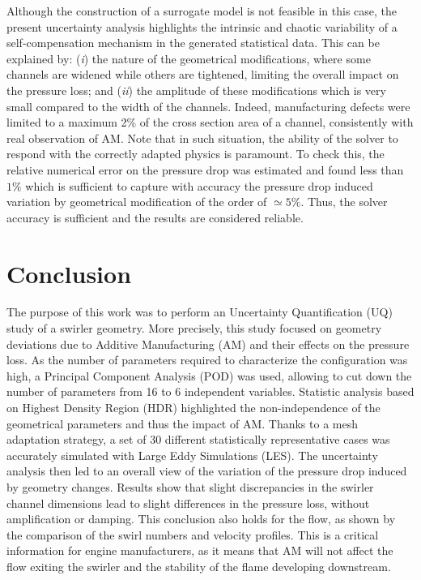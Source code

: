 Although the construction of a surrogate model is not feasible in this case, the present uncertainty analysis highlights the intrinsic and chaotic variability of a self-compensation mechanism in the generated statistical data. This can be explained by: (\emph{i}) the nature of the geometrical modifications, where some channels are widened while others are tightened, limiting the overall impact on the pressure loss; and (\emph{ii}) the amplitude of these modifications which is very small compared to the width of the channels. Indeed, manufacturing defects were limited to a maximum 2\% of the cross section area of a channel, consistently with real observation of AM. Note that in such situation, the ability of the solver to respond with the correctly adapted physics is paramount. To check this, the relative numerical error on the pressure drop was estimated and found less than $1\%$ which is sufficient to capture with accuracy the pressure drop induced variation by geometrical modification of the order of $\simeq 5\%$. Thus, the solver accuracy is sufficient and the results are considered reliable.

\section{Conclusion}
The purpose of this work was to perform an Uncertainty Quantification (UQ) study of a swirler geometry. More precisely, this study focused on geometry deviations due to Additive Manufacturing (AM) and their effects on the pressure loss. As the number of parameters required to characterize the configuration was high, a Principal Component Analysis (POD) was used, allowing to cut down the number of parameters from 16 to 6 independent variables. Statistic analysis based on Highest Density Region (HDR) highlighted the non-independence of the geometrical parameters and thus the impact of AM. Thanks to a mesh adaptation strategy, a set of 30 different statistically representative cases was accurately simulated with Large Eddy Simulations (LES). The uncertainty analysis then led to an overall view of the variation of the pressure drop induced by geometry changes. Results show that slight discrepancies in the swirler channel dimensions lead to slight differences in the pressure loss, without amplification or damping. This conclusion also holds for the flow, as shown by the comparison of the swirl numbers and velocity profiles. This is a critical information for engine manufacturers, as it means that AM will not affect the flow exiting the swirler and the stability of the flame developing downstream.

